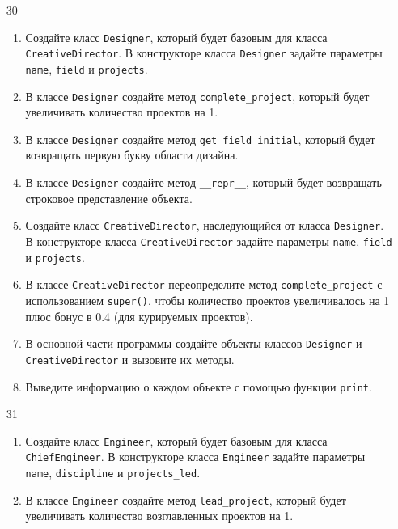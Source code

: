 \begin{enumerate}
\item[30] 
\begin{enumerate}
    \item Создайте класс \texttt{Designer}, который будет базовым для класса \texttt{CreativeDirector}. В конструкторе класса \texttt{Designer} задайте параметры \texttt{name}, \texttt{field} и \texttt{projects}.
    
    \item В классе \texttt{Designer} создайте метод \texttt{complete\_project}, который будет увеличивать количество проектов на 1.
    
    \item В классе \texttt{Designer} создайте метод \texttt{get\_field\_initial}, который будет возвращать первую букву области дизайна.
    
    \item В классе \texttt{Designer} создайте метод \texttt{\_\_repr\_\_}, который будет возвращать строковое представление объекта.
    
    \item Создайте класс \texttt{CreativeDirector}, наследующийся от класса \texttt{Designer}. В конструкторе класса \texttt{CreativeDirector} задайте параметры \texttt{name}, \texttt{field} и \texttt{projects}.
    
    \item В классе \texttt{CreativeDirector} переопределите метод \texttt{complete\_project} с использованием \texttt{super()}, чтобы количество проектов увеличивалось на 1 плюс бонус в 0.4 (для курируемых проектов).
    
    \item В основной части программы создайте объекты классов \texttt{Designer} и \texttt{CreativeDirector} и вызовите их методы.
    
    \item Выведите информацию о каждом объекте с помощью функции \texttt{print}.
\end{enumerate}

\item[31] 
\begin{enumerate}
    \item Создайте класс \texttt{Engineer}, который будет базовым для класса \texttt{ChiefEngineer}. В конструкторе класса \texttt{Engineer} задайте параметры \texttt{name}, \texttt{discipline} и \texttt{projects\_led}.
    
    \item В классе \texttt{Engineer} создайте метод \texttt{lead\_project}, который будет увеличивать количество возглавленных проектов на 1.
    

\end{enumerate}
\end{enumerate}
